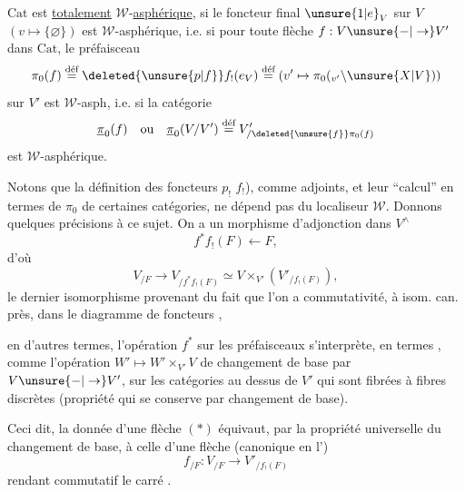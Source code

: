 
$\mathrm{Cat}$ est \uline{totalement} $\mathcal W$-\uline{asphérique}, si le foncteur
final $\unsure{1|e}_V$ sur $V$ $(v\mapsto\{\varnothing\})$ est  $\mathcal W$-asphérique,
i.e. si pour toute flèche $f:V\unsure{-|\to}V'$ dans $\mathrm{Cat}$,
le  préfaisceau
\[
 \pi_0(f)\overset{\text{déf}}{=}\deleted{\unsure{p|f}}f_!(e_V)\overset{\text{déf}}{=}
 (v'\mapsto\pi_0({}_{v'}\backslash\unsure{X|V}))
\]
sur $V'$ est $\mathcal W$-asph, i.e. si la catégorie
\[
 \underline{\pi}_0(f)\quad\text{ou}\quad\underline{\pi}_0(V/V')
 \overset{\text{déf}}{=}V'_{/\deleted{\unsure{f}}\pi_0(f)}
\]
est $\mathcal W$-asphérique.

Notons que la  définition des foncteurs
$p_!$  $f_!$),  comme adjoints, et leur
``calcul'' en termes de $\pi_0$ de certaines catégories,
ne dépend pas du localiseur $\mathcal W$. Donnons
quelques précisions à ce sujet. On a un
morphisme d'adjonction dans $V^\wedge$
\[
 f^*f_!(F)\longleftarrow F,
\]
d'où
\[
 V_{/F}\longrightarrow V_{/f^*f_!(F)}\simeq V\times_{V'}(V'_{/f_!(F)}),\tag*{(*)}
\]
le dernier isomorphisme provenant du fait que
l'on a commutativité, à isom. can. près, dans
le diagramme de foncteurs
\noindent,


en d'autres termes, l'opération $f^*$ sur les préfaisceaux s'interprète, en termes , comme
l'opération $W'\mapsto W'\times_{V'}V$ de changement
de base par $V\unsure{-|\to}V'$, sur les catégories au
dessus de $V'$ qui sont fibrées à fibres discrètes (propriété qui se conserve par changement de base).

Ceci dit, la donnée d'une flèche
$(*)$ équivaut, par la propriété universelle
du changement de base, à celle d'une
flèche (canonique en l')
\[
 f_{/F}:V_{/F}\longrightarrow V'_{/f_!(F)}
\]
rendant commutatif le carré
.

